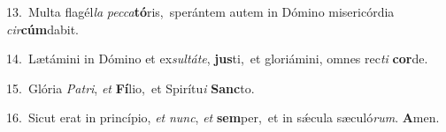 {\numbfont\textcolor{\numbcolor}{13.}}~Multa flagél\textit{la} \textit{pec}\-\textit{ca}\textbf{tó}ris,~\star sperántem autem in Dómino misericórdia \textit{cir}\-\textbf{cúm}dabit.\par
{\numbfont\textcolor{\numbcolor}{14.}}~Lætámini in Dómino et ex\-\textit{sul}\-\textit{tá}\textit{te}, \textbf{jus}\-ti,~\star et gloriámini, omnes rec\textit{ti} \textbf{cor}\-de.\par
{\numbfont\textcolor{\numbcolor}{15.}}~Glória \textit{Pa}\-\textit{tri}, \textit{et} \textbf{Fí}\-lio,~\star et Spirítu\textit{i} \textbf{Sanc}\-to.\par
{\numbfont\textcolor{\numbcolor}{16.}}~Sicut erat in princípio, \textit{et} \textit{nunc}\-, \textit{et} \textbf{sem}\-per,~\star et in sǽcula sæculó\-\textit{rum}\-. \textbf{A}\-men.\par
